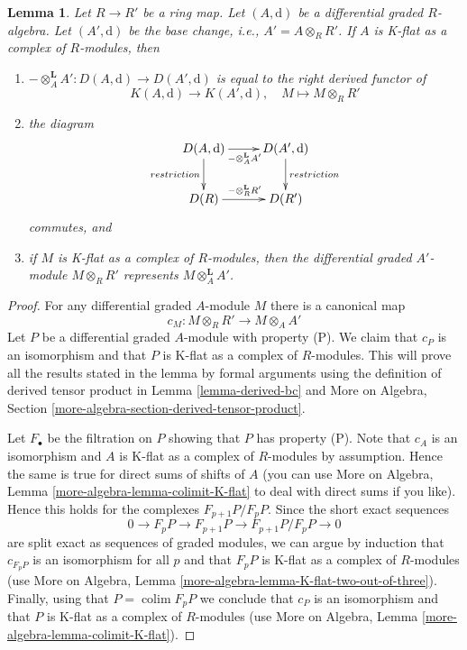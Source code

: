 \documentclass{stacks-project}
\theoremstyle{plain}
\newtheorem{lemma}[subsection]{Lemma}
\theoremstyle{definition}
\theoremstyle{remark}
\numberwithin{equation}{subsection}
\def\colim{\mathop{\mathrm{colim}}\nolimits}
\begin{document}
\begin{lemma}
\label{lemma-base-change-K-flat}
Let $R \to R'$ be a ring map. Let $(A, \text{d})$ be a differential
graded $R$-algebra. Let $(A', \text{d})$ be the base change, i.e.,
$A' = A \otimes_R R'$. If $A$ is K-flat as a complex of $R$-modules,
then
\begin{enumerate}
\item $- \otimes_A^\mathbf{L} A' : D(A, \text{d}) \to D(A', \text{d})$
is equal to the right derived functor of
$$
K(A, \text{d}) \longrightarrow K(A', \text{d}),\quad
M \longmapsto M \otimes_R R'
$$
\item the diagram
$$
\xymatrix{
D(A, \text{d}) \ar[r]_{- \otimes_A^\mathbf{L} A'} \ar[d]_{restriction} &
D(A', \text{d}) \ar[d]^{restriction} \\
D(R) \ar[r]^{- \otimes_R^\mathbf{L} R'} & D(R')
}
$$
commutes, and
\item if $M$ is K-flat as a complex of $R$-modules, then the
differential graded $A'$-module $M \otimes_R R'$ represents
$M \otimes_A^\mathbf{L} A'$.
\end{enumerate}
\end{lemma}

\begin{proof}
For any differential graded $A$-module $M$ there is a canonical map
$$
c_M : M \otimes_R R' \longrightarrow M \otimes_A A'
$$
Let $P$ be a differential graded $A$-module with property (P).
We claim that $c_P$ is an isomorphism and that $P$ is K-flat
as a complex of $R$-modules. This will prove all the results
stated in the lemma by formal arguments using the definition
of derived tensor product in Lemma \ref{lemma-derived-bc} and
More on Algebra, Section \ref{more-algebra-section-derived-tensor-product}.

\medskip\noindent
Let $F_\bullet$ be the filtration on $P$ showing that $P$ has property (P).
Note that $c_A$ is an isomorphism and $A$ is K-flat as a complex
of $R$-modules by assumption. Hence the same is true for
direct sums of shifts of $A$ (you can use
More on Algebra, Lemma \ref{more-algebra-lemma-colimit-K-flat}
to deal with direct sums if you like).
Hence this holds for the complexes $F_{p + 1}P/F_pP$.
Since the short exact sequences
$$
0 \to F_pP \to F_{p + 1}P \to F_{p + 1}P/F_pP \to 0
$$
are split exact as sequences of graded modules, we can argue
by induction that $c_{F_pP}$ is an isomorphism for all $p$
and that $F_pP$ is K-flat as a complex of $R$-modules (use
More on Algebra, Lemma \ref{more-algebra-lemma-K-flat-two-out-of-three}).
Finally, using that $P = \colim F_pP$ we conclude that
$c_P$ is an isomorphism and that $P$ is K-flat
as a complex of $R$-modules (use
More on Algebra, Lemma \ref{more-algebra-lemma-colimit-K-flat}).
\end{proof}
\end{document}
